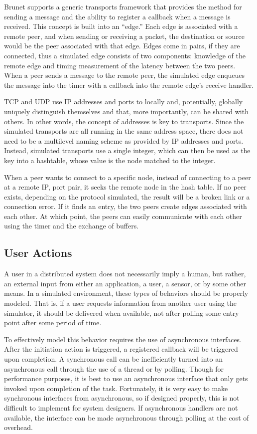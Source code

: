 Brunet supports a generic transports framework that provides the method for
sending a message and the ability to register a callback when a message is
received.  This concept is built into an ``edge.''  Each edge is associated
with a remote peer, and when sending or receiving a packet, the destination or
source would be the peer associated with that edge.  Edges come in pairs, if
they are connected, thus a simulated edge consists of two components: knowledge
of the remote edge and timing measurement of the latency between the two peers.
When a peer sends a message to the remote peer, the simulated edge enqueues the
message into the timer with a callback into the remote edge's receive handler.

TCP and UDP use IP addresses and ports to locally and, potentially, globally
uniquely distinguish themselves and that, more importantly, can be shared with
others.  In other words, the concept of addresses is key to transports.  Since
the simulated transports are all running in the same address space, there does
not need to be a multilevel naming scheme as provided by IP addresses and
ports.  Instead, simulated transports use a single integer, which can then be
used as the key into a hashtable, whose value is the node matched to the
integer.

When a peer wants to connect to a specific node, instead of connecting to a
peer at a remote IP, port pair, it seeks the remote node in the hash table.  If
no peer exists, depending on the protocol simulated, the result will be a
broken link or a connection error.  If it finds an entry, the two peers create
edges associated with each other.  At which point, the peers can easily
communicate with each other using the timer and the exchange of buffers.

\subsection{User Actions}

A user in a distributed system does not necessarily imply a human, but rather,
an external input from either an application, a user, a sensor, or by some
other means.  In a simulated environment, these types of behaviors should be
properly modeled.  That is, if a user requests information from another user
using the simulator, it should be delivered when available, not after polling
some entry point after some period of time.

To effectively model this behavior requires the use of asynchronous interfaces.
After the initiation action is triggered, a registered callback will be
triggered upon completion.  A synchronous call can be inefficiently turned into
an asynchronous call through the use of a thread or by polling.  Though for
performance purposes, it is best to use an asynchronous interface that only
gets invoked upon completion of the task.  Fortunately, it is very easy to make
synchronous interfaces from asynchronous, so if designed properly, this is not
difficult to implement for system designers.  If asynchronous handlers are not
available, the interface can be made asynchronous through polling at the cost
of overhead.

